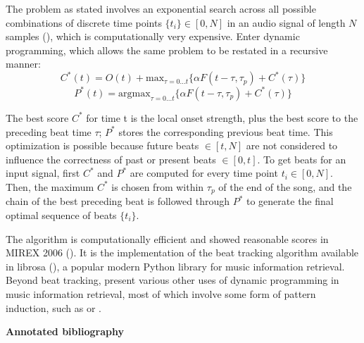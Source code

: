 \documentclass[letter,11pt]{report}
\begin{document}
The problem as stated involves an exponential search across all possible combinations of discrete time points $\{t_{i}\} \in [0, N]$ in an audio signal of length $N$ samples (\cite{ellis2}), which is computationally very expensive. Enter dynamic programming, which allows the same problem to be restated in a recursive manner:
\[ C^{*}(t) = O(t) + \text{max}_{\tau = 0...t}\{\alpha F(t-\tau, \tau_{p}) + C^{*}(\tau)\} \]
\[ P^{*}(t) = \text{argmax}_{\tau = 0...t} \{\alpha F(t-\tau, \tau_{p}) + C^{*}(\tau)\} \]

The best score $C^{*}$ for time t is the local onset strength, plus the best score to the preceding beat time $\tau$; $P^{*}$ stores the corresponding previous beat time. This optimization is possible because future beats $\in [t, N]$ are not considered to influence the correctness of past or present beats $\in [0, t]$. To get beats for an input signal, first $C^{*}$ and $P^{*}$ are computed for every time point $t_{i} \in [0, N]$. Then, the maximum $C^{*}$ is chosen from within $\tau_{p}$ of the end of the song, and the chain of the best preceding beat is followed through $P^{*}$ to generate the final optimal sequence of beats $\{t_{i}\}$.

The algorithm is computationally efficient and showed reasonable scores in MIREX 2006 (\cite{mirexabt}). It is the implementation of the beat tracking algorithm available in librosa (\cite{librosa}), a popular modern Python library for music information retrieval. Beyond beat tracking, \textcite{mirsurvey} present various other uses of dynamic programming in music information retrieval, most of which involve some form of pattern induction, such as \cite{dp2} or \cite{dp3}.

\vfill
\clearpage

\noindent\LARGE{\textbf{Annotated bibliography}}\\

\vspace{-0.5em}

\nocite{*}
\printbibliography[heading=none]
\end{document}
